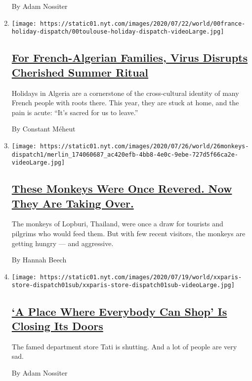 \begin{enumerate}
  By Adam Nossiter
\item
  \texttt{[image: https://static01.nyt.com/images/2020/07/22/world/00france-holiday-dispatch/00toulouse-holiday-dispatch-videoLarge.jpg]}

  \hypertarget{for-french-algerian-families-virus-disrupts-cherished-summer-ritual}{%
  \subsection{\texorpdfstring{\href{/2020/07/26/world/europe/france-algeria-summer-vacations.html}{For
  French-Algerian Families, Virus Disrupts Cherished Summer
  Ritual}}{For French-Algerian Families, Virus Disrupts Cherished Summer Ritual}}\label{for-french-algerian-families-virus-disrupts-cherished-summer-ritual}}

  Holidays in Algeria are a cornerstone of the cross-cultural identity
  of many French people with roots there. This year, they are stuck at
  home, and the pain is acute: ``It's sacred for us to leave.''

  By Constant Méheut
\item
  \texttt{[image: https://static01.nyt.com/images/2020/07/26/world/26monkeys-dispatch1/merlin\_174060687\_ac420efb-4bb8-4e0c-9ebe-727d5f66ca2e-videoLarge.jpg]}

  \hypertarget{these-monkeys-were-once-revered-now-they-are-taking-over}{%
  \subsection{\texorpdfstring{\href{/2020/07/25/world/asia/thailand-monkeys.html}{These
  Monkeys Were Once Revered. Now They Are Taking
  Over.}}{These Monkeys Were Once Revered. Now They Are Taking Over.}}\label{these-monkeys-were-once-revered-now-they-are-taking-over}}

  The monkeys of Lopburi, Thailand, were once a draw for tourists and
  pilgrims who would feed them. But with few recent visitors, the
  monkeys are getting hungry --- and aggressive.

  By Hannah Beech
\item
  \texttt{[image: https://static01.nyt.com/images/2020/07/19/world/xxparis-store-dispatch01sub/xxparis-store-dispatch01sub-videoLarge.jpg]}

  \hypertarget{a-place-where-everybody-can-shop-is-closing-its-doors}{%
  \subsection{\texorpdfstring{\href{/2020/07/20/world/europe/france-paris-tati-coronavirus.html}{`A
  Place Where Everybody Can Shop' Is Closing Its
  Doors}}{`A Place Where Everybody Can Shop' Is Closing Its Doors}}\label{a-place-where-everybody-can-shop-is-closing-its-doors}}

  The famed department store Tati is shutting. And a lot of people are
  very sad.

  By Adam Nossiter
\end{enumerate}

